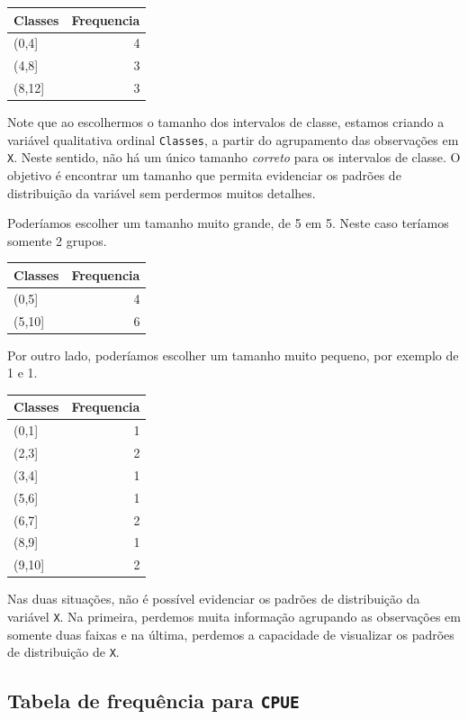 \documentclass[
]{book}
\begin{document}
\begin{tabular}{l|r}
\hline
Classes & Frequencia\\
\hline
(0,4] & 4\\
\hline
(4,8] & 3\\
\hline
(8,12] & 3\\
\hline
\end{tabular}

Note que ao escolhermos o tamanho dos intervalos de classe, estamos criando a variável qualitativa ordinal \texttt{Classes}, a partir do agrupamento das observações em \texttt{X}. Neste sentido, não há um único tamanho \emph{correto} para os intervalos de classe. O objetivo é encontrar um tamanho que permita evidenciar os padrões de distribuição da variável sem perdermos muitos detalhes.

Poderíamos escolher um tamanho muito grande, de 5 em 5. Neste caso teríamos somente 2 grupos.

\begin{tabular}{l|r}
\hline
Classes & Frequencia\\
\hline
(0,5] & 4\\
\hline
(5,10] & 6\\
\hline
\end{tabular}

Por outro lado, poderíamos escolher um tamanho muito pequeno, por exemplo de 1 e 1.

\begin{tabular}{l|r}
\hline
Classes & Frequencia\\
\hline
(0,1] & 1\\
\hline
(2,3] & 2\\
\hline
(3,4] & 1\\
\hline
(5,6] & 1\\
\hline
(6,7] & 2\\
\hline
(8,9] & 1\\
\hline
(9,10] & 2\\
\hline
\end{tabular}

Nas duas situações, não é possível evidenciar os padrões de distribuição da variável \texttt{X}. Na primeira, perdemos muita informação agrupando as observações em somente duas faixas e na última, perdemos a capacidade de visualizar os padrões de distribuição de \texttt{X}.

\hypertarget{tabela-de-frequuxeancia-para-cpue}{%
\subsection{\texorpdfstring{Tabela de frequência para \texttt{CPUE}}{Tabela de frequência para CPUE}}\label{tabela-de-frequuxeancia-para-cpue}}
\end{document}

